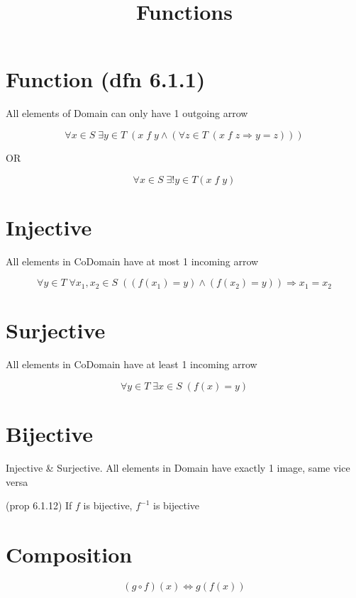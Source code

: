 \documentclass[12pt]{article}
\title{\textbf{Functions}}
\date{}
\begin{document}
\maketitle

\begin{spacing}{1.5}

\section{Function (dfn 6.1.1)}

All elements of Domain can only have 1 outgoing arrow

$$\forall x \in S \; 
\exists y \in T \; 
(x \; f \; y \wedge 
(\forall z \in T \; 
(x \; f \; z \Rightarrow y = z)))$$

OR 

$$\forall x \in S \;
\exists! y \in T (x \; f \; y)$$


\section{Injective}

All elements in CoDomain have at most 1 incoming arrow

$$\forall y \in T \; 
\forall x_1, x_2 \in S \; 
((f(x_1)=y) \wedge (f(x_2) = y)) \Rightarrow x_1 = x_2$$

\section{Surjective}

All elements in CoDomain have at least 1 incoming arrow

$$\forall y \in T \; 
\exists x \in S \;
(f(x) = y)$$

\section{Bijective}

Injective \& Surjective. All elements in Domain have exactly 1 image, same vice versa

\begin{itemize*}
	\item (prop 6.1.12) If $f$ is bijective, $f^{-1}$ is bijective
\end{itemize*}

\section{Composition}

$$(g \circ f) (x) \Leftrightarrow g(f(x))$$


\end{spacing}
\end{document}
